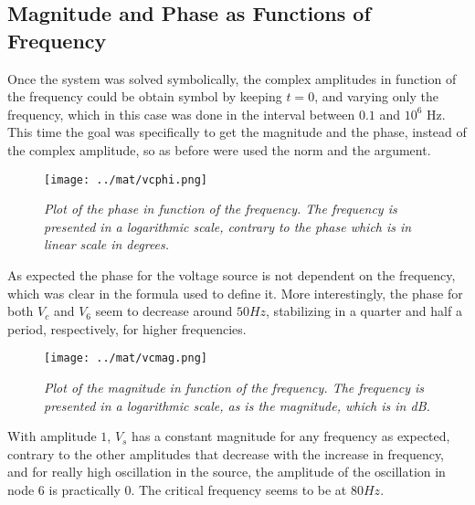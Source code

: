 \subsection{Magnitude and Phase as Functions of Frequency}

Once the system was solved symbolically, the complex amplitudes in function of the frequency could be obtain symbol by keeping $t=0$, and varying only the frequency, which in this case was done in the interval between $0.1$ and $10^6$ Hz. This time the goal was specifically to get the magnitude and the phase, instead of the complex amplitude, so as before were used the norm and the argument.

\begin{figure}[H]
    \centering
    \texttt{[image: ../mat/vcphi.png]}
        \caption{\textit{Plot of the phase in function of the frequency. The frequency is presented in a logarithmic scale, contrary to the phase which is in linear scale in degrees.}}
    \label{fig:phase}
\end{figure}

As expected the phase for the voltage source is not dependent on the frequency, which was clear in the formula used to define it. More interestingly, the phase for both $V_c$ and $V_6$ seem to decrease around $50Hz$, stabilizing in a quarter and half a period, respectively, for higher frequencies.  


\begin{figure}[H]
    \centering
    \texttt{[image: ../mat/vcmag.png]}
        \caption{\textit{Plot of the magnitude in function of the frequency. The frequency is presented in a logarithmic scale, as is the magnitude, which is in dB.}}
    \label{fig:magnitude}
\end{figure}

With amplitude $1$, $V_s$ has a constant magnitude for any frequency as expected, contrary to the other amplitudes that decrease with the increase in frequency, and for really high oscillation in the source, the amplitude of the oscillation in node 6 is practically 0. The critical frequency seems to be at $80Hz$.